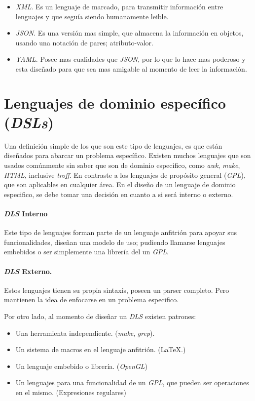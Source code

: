 \documentclass[12pt,letterpaper,titlepage,oneside,openright]{book}
\newcommand{\latex}{\LaTeX\xspace}
\begin{document}
\begin{itemize}
    \item \textit{XML}. Es un lenguaje de marcado, para transmitir información entre lenguajes y que seguía siendo humanamente leible.
    \item \textit{JSON}. Es una versión mas simple, que almacena la información en objetos, usando una notación de pares; atributo-valor. 
    \item \textit{YAML}. Posee mas cualidades que \textit{JSON}, por lo que lo hace mas poderoso y esta diseñado para que sea mas amigable al momento de leer la información.
\end{itemize}

\section{Lenguajes de dominio específico (\textit{DSLs})}

Una definición simple de los que son este tipo de lenguajes, es que están diseñados para abarcar un problema específico. Existen muchos lenguajes que son usados comúnmente sin saber que son de dominio especifico, como \textit{awk}, \textit{make}, \textit{HTML}, inclusive \textit{troff}. En contraste a los lenguajes de propósito general (\textit{GPL}), que son aplicables en cualquier área. En el diseño de un lenguaje de dominio especifico, se debe tomar una decisión en cuanto a si será interno o externo.

\paragraph{\textit{DLS} Interno}

Este tipo de lenguajes forman parte de un lenguaje anfitrión para apoyar sus funcionalidades, diseñan una modelo de uso; pudiendo llamarse lenguajes embebidos o ser simplemente una librería del un \textit{GPL}.

\paragraph{\textit{DLS} Externo.}

Estos lenguajes tienen su propia sintaxis, poseen un parser completo. Pero mantienen la idea de enfocarse en un problema especifico.

Por otro lado, al momento de diseñar un \textit{DLS} existen patrones:

\begin{itemize}
    \item Una herramienta independiente. (\textit{make}, \textit{grep}).
    \item Un sistema de macros en el lenguaje anfitrión. (\latex.)
    \item Un lenguaje embebido o librería. (\textit{OpenGL})
    \item Un lenguajes para una funcionalidad de un \textit{GPL}, que pueden ser operaciones en el mismo. (Expresiones regulares)
\end{itemize}
\end{document}
